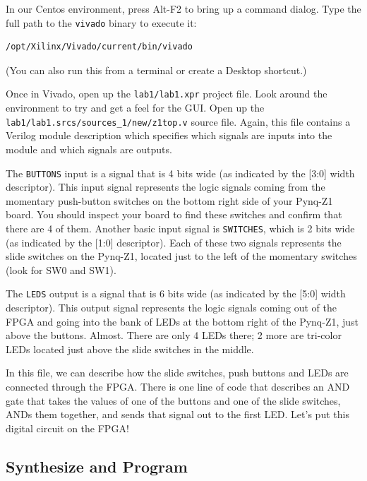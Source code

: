 \documentclass[11pt]{article}
\begin{document}
In our Centos environment, press Alt-F2 to bring up a command dialog. Type the full path to the \verb|vivado| binary to execute it:

\begin{verbatim}
/opt/Xilinx/Vivado/current/bin/vivado
\end{verbatim}

(You can also run this from a terminal or create a Desktop shortcut.)

Once in Vivado, open up the \verb|lab1/lab1.xpr| project file. Look around the environment to try and get a feel for the GUI. Open up the \verb|lab1/lab1.srcs/sources_1/new/z1top.v| source file. Again, this file contains a Verilog module description which specifies which signals are inputs into the module and which signals are outputs.

The \verb|BUTTONS| input is a signal that is 4 bits wide (as indicated by the [3:0] width descriptor). This input signal represents the logic signals coming from the momentary push-button switches on the bottom right side of your Pynq-Z1 board. You should inspect your board to find these switches and confirm that there are 4 of them. Another basic input signal is \verb|SWITCHES|, which is 2 bits wide (as indicated by the [1:0] descriptor). Each of these two signals represents the slide switches on the Pynq-Z1, located just to the left of the momentary switches (look for SW0 and SW1).

The \verb|LEDS| output is a signal that is 6 bits wide (as indicated by the [5:0] width descriptor). This output signal represents the logic signals coming out of the FPGA and going into the bank of LEDs at the bottom right of the Pynq-Z1, just above the buttons. Almost. There are only 4 LEDs there; 2 more are tri-color LEDs located just above the slide switches in the middle.

In this file, we can describe how the slide switches, push buttons and LEDs are connected through the FPGA. There is one line of code that describes an AND gate that takes the values of one of the buttons and one of the slide switches, ANDs them together, and sends that signal out to the first LED. Let's put this digital circuit on the FPGA!

\subsection{Synthesize and Program}
\end{document}
